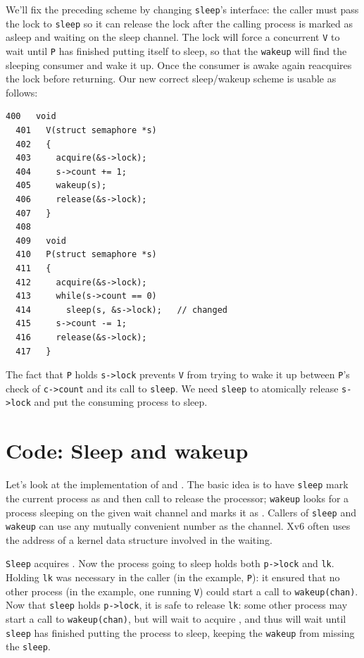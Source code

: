 We'll fix the preceding scheme by changing
\lstinline{sleep}'s
interface:
the caller must pass the lock to
\lstinline{sleep}
so it can release the lock after
the calling process is marked as asleep and waiting on the
sleep channel.
The lock will force a concurrent
\lstinline{V}
to wait until \lstinline{P} has finished putting itself to sleep,
so that the
\lstinline{wakeup}
will find the sleeping consumer and wake it up.
Once the consumer is awake again
reacquires the lock before returning.
Our new correct sleep/wakeup scheme is usable as follows:
\begin{lstlisting}[]
  400   void
  401   V(struct semaphore *s)
  402   {
  403     acquire(&s->lock);
  404     s->count += 1;
  405     wakeup(s);
  406     release(&s->lock);
  407   }
  408   
  409   void
  410   P(struct semaphore *s)
  411   {
  412     acquire(&s->lock);
  413     while(s->count == 0)
  414       sleep(s, &s->lock);   // changed
  415     s->count -= 1;
  416     release(&s->lock);
  417   }
\end{lstlisting}

The fact that
\lstinline{P}
holds
\lstinline{s->lock}
prevents 
\lstinline{V}
from trying to wake it up between 
\lstinline{P}'s
check of
\lstinline{c->count}
and its call to
\lstinline{sleep}.
We need
\lstinline{sleep}
to atomically release
\lstinline{s->lock}
and put the consuming process to sleep.

\section{Code: Sleep and wakeup}

Let's look at the implementation of
and
.
The basic idea is to have
\lstinline{sleep}
mark the current process as
and then call
to release the processor;
\lstinline{wakeup}
looks for a process sleeping on the given wait channel
and marks it as 
.
Callers of
\lstinline{sleep}
and
\lstinline{wakeup}
can use any mutually convenient number as the channel.
Xv6 often uses the address
of a kernel data structure involved in the waiting.

\lstinline{Sleep}
acquires 
.
Now the process going to sleep holds both
\lstinline{p->lock}
and
\lstinline{lk}.
Holding
\lstinline{lk}
was necessary in the caller (in the example,
\lstinline{P}):
it
ensured that no other process (in the example,
one running
\lstinline{V})
could start a call to
\lstinline{wakeup(chan)}.
Now that
\lstinline{sleep}
holds
\lstinline{p->lock},
it is safe to release
\lstinline{lk}:
some other process may start a call to
\lstinline{wakeup(chan)},
but
will wait to acquire
,
and thus will wait until
\lstinline{sleep}
has finished putting the process to sleep,
keeping the
\lstinline{wakeup}
from missing the
\lstinline{sleep}.

